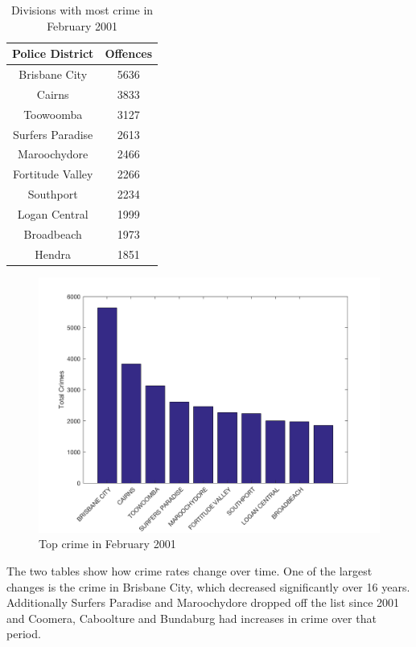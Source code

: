 \documentclass[]{article}
\begin{document}
\begin{table}[H]
    \caption{Divisions with most crime in February 2001}
    \centering
    \begin{tabular}{|c|c|}
        \hline
        Police District & Offences \\
        \hline
        Brisbane City & 5636 \\
        Cairns & 3833 \\
        Toowoomba & 3127 \\
        Surfers Paradise & 2613 \\
        Maroochydore & 2466 \\
        Fortitude Valley & 2266 \\
        Southport & 2234 \\
        Logan Central & 1999 \\
        Broadbeach & 1973 \\
        Hendra & 1851 \\
        \hline
    \end{tabular}
\end{table}

\begin{figure}[H]
    \caption{Top crime in February 2001}
    \centering
    \includegraphics[width=\linewidth]{../images/top_crime_2001}
\end{figure}

The two tables show how crime rates change over time.
One of the largest changes is the crime in Brisbane City, which decreased significantly over 16 years.
Additionally Surfers Paradise and Maroochydore dropped off the list since 2001 and Coomera, Caboolture and Bundaburg had increases in crime over that period.
\end{document}
